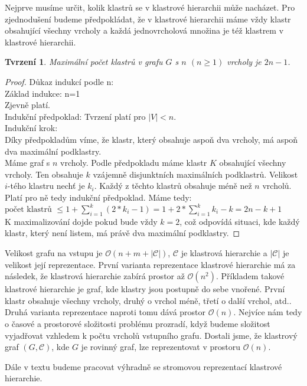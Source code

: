 \documentclass[12pt,a4report]{report}
\newtheorem{tvr}[theorem]{Tvrzení}
\theoremstyle{definition}
\begin{document}
Nejprve musíme určit, kolik klastrů se v klastrové hierarchii může nacházet.
Pro zjednodušení budeme předpokládat, že v klastrové hierarchii máme vždy klastr obsahující všechny vrcholy a každá jednovrcholová množina je též klastrem v klastrové hierarchii.
\begin{tvr}
Maximální počet klastrů v grafu $G$ s $n$ $(n \geq 1)$ vrcholy je $2n-1$.
\end{tvr}
\begin{proof}
Důkaz indukcí podle n: \\
Základ indukce: n=1 \\
Zjevně platí. \\
Indukční předpoklad: Tvrzení platí pro $|V| < n$.\\
Indukční krok:  \\
Díky předpokladům víme, že klastr, který obsahuje aspoň dva vrcholy, má aspoň dva maximální podklastry. \\
Máme graf s $n$ vrcholy. Podle předpokladu máme klastr $K$ obsahující všechny vrcholy. Ten obsahuje $k$ vzájemně disjunktních maximálních podklastrů. Velikost $i$-tého klastru nechť je $k_i$. Každý z těchto klastrů obsahuje méně než $n$ vrcholů. Platí pro ně tedy indukční předpoklad. Máme tedy: \\
$\text{počet klastrů } \leq 1 + \sum\limits_{i=1}^k (2*k_i-1) = 1 + 2*\sum\limits_{i=1}^k k_i - k = 2n - k + 1 $\\
K maximalizování dojde pokud bude vždy $k=2$, což odpovídá situaci, kde každý klastr, který není listem, má právě dva maximální podklastry.
\end{proof}

Velikost grafu na vstupu je  $\mathcal{O}(n+m+| \mathcal C|)$, $\mathcal C$ je klastrová hierarchie a $| \mathcal C|$ je velikost její reprezentace. První varianta reprezentace klastrové hierarchie má za následek, že klastrová hierarchie zabírá prostor až $\mathcal{O}(n^2)$. Příkladem takové klastrové hierarchie je graf, kde klastry jsou postupně do sebe vnořené. První klastr obsahuje všechny vrcholy, druhý o vrchol méně, třetí o další vrchol, atd..
Druhá varianta reprezentace naproti tomu dává prostor $\mathcal{O}(n)$. Nejvíce nám tedy o časové a prostorové složitosti problému prozradí, když budeme složitost vyjadřovat vzhledem k počtu vrcholů vstupního grafu. Dostali jsme, že klastrový graf $(G,\mathcal C )$, kde $G$ je rovinný graf, lze reprezentovat v prostoru $\mathcal O (n)$.

Dále v textu budeme pracovat výhradně se stromovou reprezentací klastrové hierarchie.
\end{document}
